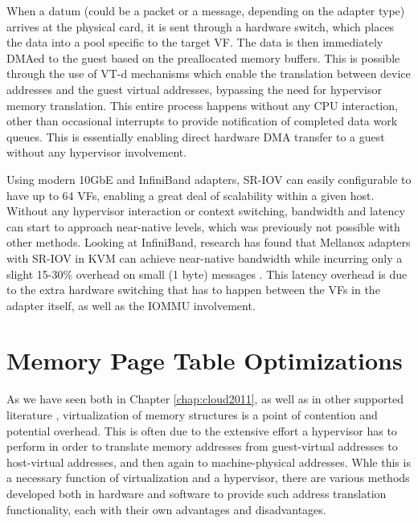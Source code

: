 When a datum (could be a packet or a message, depending on the adapter type) arrives at the physical card, it is sent through a hardware switch, which places the data into a pool specific to the target VF. The data is then immediately DMAed to the guest based on the preallocated memory buffers. This is possible through the use of VT-d mechanisms which enable the translation between device addresses and the guest virtual addresses, bypassing the need for hypervisor memory translation. This entire process happens without any CPU interaction, other than occasional interrupts to provide notification of completed data work queues.   This is essentially enabling direct hardware DMA transfer to a guest without any hypervisor involvement.
 
Using modern 10GbE and InfiniBand adapters, SR-IOV can easily configurable to have up to 64 VFs, enabling a great deal of scalability within a given host.  Without any hypervisor interaction or context switching, bandwidth and latency can start to approach near-native levels, which was previously not possible with other methods. Looking at InfiniBand, research has found that Mellanox adapters with SR-IOV in KVM can achieve near-native bandwidth while incurring only a slight 15-30\% overhead on small (1 byte) messages \cite{Musleh2014cloud, jose2013sr}. This latency overhead is due to the extra hardware switching that has to happen between the VFs in the adapter itself, as well as the IOMMU involvement.   

 


\section{Memory Page Table Optimizations}

As we have seen both in Chapter \ref{chap:cloud2011}, as well as in other supported literature \cite{MagellanFinal}, virtualization of memory structures is a point of contention and potential overhead. This is often due to the extensive effort a hypervisor has to perform in order to translate memory addresses from guest-virtual addresses to host-virtual addresses, and then again to machine-physical addresses.  Whle this is a necessary function of virtualization and a hypervisor, there are various methods developed both in hardware and software to provide such address translation functionality, each with their own advantages and disadvantages. 

